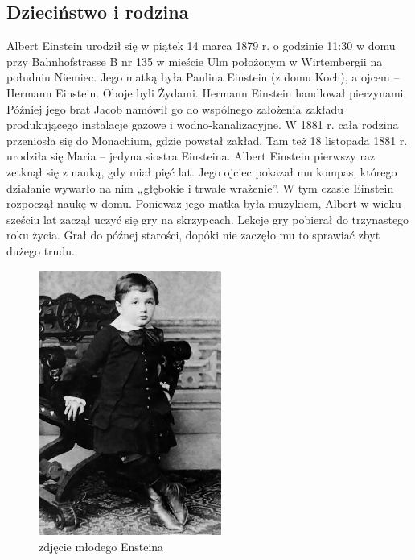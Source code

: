 \documentclass[11pt]{article}
\begin{document}
\subsection{Dzieciństwo i rodzina}
Albert Einstein urodził się w piątek 14 marca 1879 r. o godzinie 11:30 w domu przy Bahnhofstrasse B nr 135 w mieście Ulm położonym w Wirtembergii na południu Niemiec. Jego matką była Paulina Einstein (z domu Koch), a ojcem – Hermann Einstein. Oboje byli Żydami. Hermann Einstein handlował pierzynami. Później jego brat Jacob namówił go do wspólnego założenia zakładu produkującego instalacje gazowe i wodno-kanalizacyjne. W 1881 r. cała rodzina przeniosła się do Monachium, gdzie powstał zakład. Tam też 18 listopada 1881 r. urodziła się Maria – jedyna siostra Einsteina.
Albert Einstein pierwszy raz zetknął się z nauką, gdy miał pięć lat. Jego ojciec pokazał mu kompas, którego działanie wywarło na nim „głębokie i trwałe wrażenie”. W tym czasie Einstein rozpoczął naukę w domu. Ponieważ jego matka była muzykiem, Albert w wieku sześciu lat zaczął uczyć się gry na skrzypcach. Lekcje gry pobierał do trzynastego roku życia. Grał do późnej starości, dopóki nie zaczęło mu to sprawiać zbyt dużego trudu\cite{Jeremy}.
\begin{figure}[ht]
\begin{center}
\includegraphics[width=6cm]{Albert_Einstein_at_the_age_of_three_(1882)}
\caption{zdjęcie młodego Ensteina}
\label{młody_einstain}
\end{center}
\end{figure}
\newpage
\end{document}
